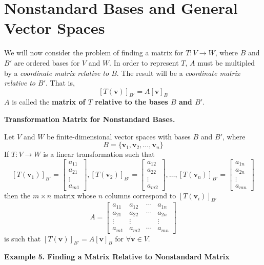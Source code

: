 \documentclass{article}
\begin{document}
    \section{Nonstandard Bases and General Vector Spaces}
    We will now consider the problem of finding a matrix for $T: V \to W$, where $B$ and $B'$ are ordered bases for $V$ and $W$.
    In order to represent $T$, $A$ must be multipled by a \textit{coordinate matrix relative to $B$}. The result will be a 
    \textit{coordinate matrix relative to $B'$}. That is,
    \[[T( \textbf{v} )]_{B'} = A[ \textbf{v} ]_B\]
    $A$ is called the \textbf{matrix of $T$ relative to the bases $B$ and $B'$}.
    \begin{tcolorbox}[colback = {blue9}]
        \textbf{Transformation Matrix for Nonstandard Bases.}

        Let $V$ and $W$ be finite-dimensional vector spaces with bases $B$ and $B'$, where
        \[B = \{ \textbf{v}_1, \textbf{v}_2, \dots, \textbf{v}_n\}\]
        If $T: V \to W$ is a linear transformation such that
        \[ [T( \textbf{v}_1 )]_{B'} = \begin{bmatrix}
            a_{11} \\
            a_{21} \\
            \vdots \\
            a_{m1}
        \end{bmatrix} ,
        [T( \textbf{v}_2 )]_{B'} = \begin{bmatrix}
            a_{12} \\
            a_{22} \\
            \vdots \\
            a_{m2}
        \end{bmatrix}, \dots,
        [T( \textbf{v}_n )]_{B'} = \begin{bmatrix}
            a_{1n} \\
            a_{2n} \\
            \vdots \\
            a_{mn}
        \end{bmatrix} \]
        then the $m \times n$ matrix whose $n$ columns correspond to $[T( \textbf{v}_i )]_{B'}$
        \[A = \begin{bmatrix}
            a_{11} & a_{12} & \cdots & a_{1n} \\
            a_{21} & a_{22} & \cdots & a_{2n} \\
            \vdots & \vdots & & \vdots \\
            a_{m1} & a_{m 2} & \cdots & a_{m n}
        \end{bmatrix} \]
        is such that $[T( \textbf{v} )]_{B'} = A[ \textbf{v} ]_B$ for $\forall \textbf{v} \in V$.
    \end{tcolorbox}
    \textbf{Example 5. \textcolor{blue5}{Finding a Matrix Relative to Nonstandard Matrix}}
\end{document}
